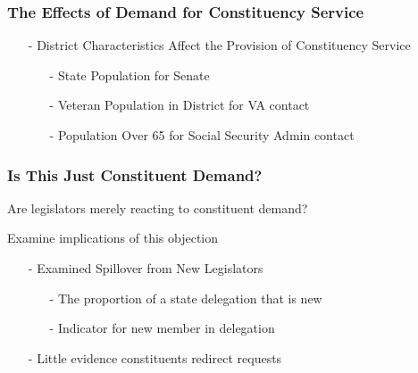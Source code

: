 \documentclass[xcolor=dvipsnames]{beamer}
\begin{document}
\begin{frame}
\frametitle{The Effects of Demand for Constituency Service}
\begin{itemize}
\item[-]District Characteristics Affect the Provision of Constituency Service
\begin{itemize}
\item[-] State Population for Senate
\item[-] Veteran Population in District for VA contact
\item[-] Population Over 65 for Social Security Admin contact
\end{itemize}
\end{itemize}
\end{frame}
\begin{frame}
\frametitle{Is This Just Constituent Demand?}

Are legislators merely reacting to constituent demand? \pause 
\begin{itemize}
	 \pause 
	 \pause 
	 \pause 
\end{itemize}


Examine implications of this objection
\begin{itemize}
\item[-] Examined Spillover from New Legislators
\begin{itemize}
\item[-] The proportion of a state delegation that is new
\item[-] Indicator for new member in delegation
\end{itemize}
\item[-] Little evidence constituents redirect requests

\end{itemize}	



\end{frame}
\end{document}
